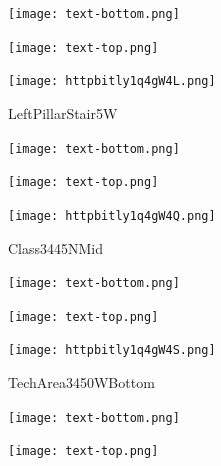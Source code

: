 \documentclass[letterpaper]{article}
\begin{document}
 \centerline{\texttt{[image: text-bottom.png]}} 
 
 \pagebreak 
{} 
 \vspace*{\fill} 
 
  \centerline{\texttt{[image: text-top.png]}} 
 
 \vspace{0.5in} 
 
 \begingroup 
 \centerline{\texttt{[image: httpbitly1q4gW4L.png]}} 
 \endgroup 
 \vspace*{\fill} 

 \hfill{\small LeftPillarStair5W} 

  \vspace{0.7in} 
 
 \centerline{\texttt{[image: text-bottom.png]}} 
 
 \pagebreak 
{} 
 \vspace*{\fill} 
 
  \centerline{\texttt{[image: text-top.png]}} 
 
 \vspace{0.5in} 
 
 \begingroup 
 \centerline{\texttt{[image: httpbitly1q4gW4Q.png]}} 
 \endgroup 
 \vspace*{\fill} 

 \hfill{\small Class3445NMid} 

  \vspace{0.7in} 
 
 \centerline{\texttt{[image: text-bottom.png]}} 
 
 \pagebreak 
{} 
 \vspace*{\fill} 
 
  \centerline{\texttt{[image: text-top.png]}} 
 
 \vspace{0.5in} 
 
 \begingroup 
 \centerline{\texttt{[image: httpbitly1q4gW4S.png]}} 
 \endgroup 
 \vspace*{\fill} 

 \hfill{\small TechArea3450WBottom} 

  \vspace{0.7in} 
 
 \centerline{\texttt{[image: text-bottom.png]}} 
 
 \pagebreak 
{} 
 \vspace*{\fill} 
 
  \centerline{\texttt{[image: text-top.png]}} 
 
 \vspace{0.5in} 
 
\end{document}
